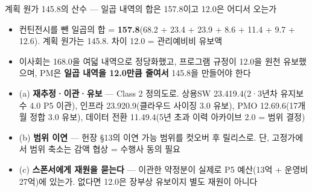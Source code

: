 \begin{frame}{계획 원가 145.8의 산수 — 일곱 내역의 합은 157.8이고 12.0은 어디서 오는가}
\begin{itemize}
\item 컨틴전시를 뺀 일곱의 합 = \textbf{157.8}(68.2 + 23.4 + 23.9 + 8.6 + 11.4 + 9.7 + 12.6). 계획 원가는 145.8. 차이 12.0 = 관리예비비 유보액
\item 이사회는 168.0을 여덟 내역으로 정당화했고, 프로그램 규정이 12.0을 원천 유보했으며, PM은 \textbf{일곱 내역을 12.0만큼 줄여서} 145.8을 만들어야 한다
\item (a) \textbf{재추정·이관·유보} — Class 2 정의도로. 상용SW 23.4\ra{}19.4(2·3년차 유지보수 4.0 P5 이관), 인프라 23.9\ra{}20.9(클라우드 사이징 3.0 유보), PMO 12.6\ra{}9.6(17개월 정합 3.0 유보), 데이터 전환 11.4\ra{}9.4(5년 초과 이력 아카이브 2.0 = 범위 결정)
\item (b) \textbf{범위 이연} — 헌장 §13의 이연 가능 범위를 컷오버 후 릴리스로. 단, 고정가에서 범위 축소는 감액 협상 = 수행사 동의 필요
\item (c) \textbf{스폰서에게 재원을 묻는다} — 이관한 약정분이 실제로 P5 예산(13억 + 운영비 27억)에 있는가. 없다면 12.0은 장부상 유보이지 별도 재원이 아니다
\end{itemize}
\end{frame}

